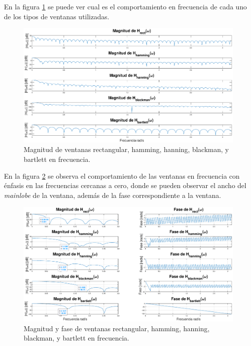 \begin{enumerate}
En la figura \ref{ventanas-magnitud} se puede ver cual es el comportamiento en  frecuencia de cada uno de los tipos de ventanas utilizadas.

\begin{figure}[H]
    \centering
    \includegraphics[scale = 0.3]{Figuras/p2_2-Ventanas-frecuencia.eps}
    \caption{Magnitud de ventanas rectangular, hamming, hanning, blackman, y bartlett en frecuencia.}
    \label{ventanas-magnitud}
\end{figure}


En la figura \ref{vent-mag-fase} se observa el comportamiento de las ventanas en frecuencia con énfasis en las frecuencias cercanas a cero, donde se pueden observar el ancho del \textit{mainlobe} de la ventana, además de la fase correspondiente a la ventana.

\begin{figure}[H]
    \centering
    \includegraphics[scale = 0.3]{Figuras/p2_2-Magnitud-Fase.eps}
    \caption{Magnitud  y fase de ventanas rectangular, hamming, hanning, blackman, y bartlett en frecuencia. }
    \label{vent-mag-fase}
\end{figure}


\end{enumerate}
